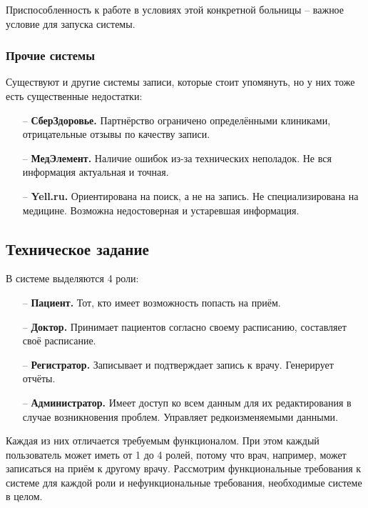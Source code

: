 \documentclass[a4paper,article]{article}
\begin{document}
\begin{sloppypar}
        Приспособленность к работе в условиях этой конкретной больницы -- важное условие для запуска системы.
        
    \subsubsection{Прочие системы}
    
        Существуют и другие системы записи, которые стоит упомянуть, но у них тоже есть существенные недостатки:
        
        \begin{itemize}[nolistsep]
            \item[--] \textbf{СберЗдоровье.} Партнёрство ограничено определёнными клиниками, отрицательные отзывы по качеству записи.
            \item[--] \textbf{МедЭлемент.} Наличие ошибок из-за технических неполадок. Не вся информация актуальная и точная.
            \item[--] \textbf{Yell.ru.} Ориентирована на поиск, а не на запись. Не специализирована на медицине. Возможна недостоверная и устаревшая информация.
        \end{itemize}

    \subsection{Техническое задание}\label{Техническое задание}

        В системе выделяются 4 роли:

        \begin{itemize}[nolistsep]
            \item[--] \textbf{Пациент.} Тот, кто имеет возможность попасть на приём.
            \item[--] \textbf{Доктор.} Принимает пациентов согласно своему расписанию, составляет своё расписание.
            \item[--] \textbf{Регистратор.} Записывает и подтверждает запись к врачу. Генерирует отчёты.
            \item[--] \textbf{Администратор.} Имеет доступ ко всем данным для их редактирования в случае возникновения проблем. Управляет редкоизменяемыми данными.
        \end{itemize}

        Каждая из них отличается требуемым функционалом. При этом каждый пользователь может иметь от 1 до 4 ролей, потому что врач, например, может записаться на приём к другому врачу. Рассмотрим функциональные требования к системе для каждой роли и нефункциональные требования, необходимые системе в целом.


\end{sloppypar}
\end{document}
